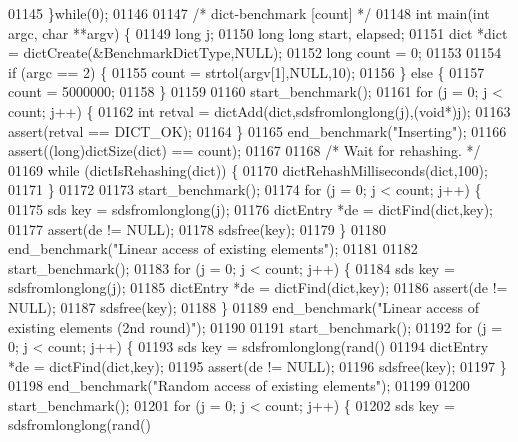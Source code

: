 \begin{DoxyCode}
{{{{{{{{{01145 \textcolor{preprocessor}{\}}\textcolor{preprocessor}{while}\textcolor{preprocessor}{(}0\textcolor{preprocessor}{)}\textcolor{preprocessor}{;}
01146 
01147 \textcolor{comment}{/* dict-benchmark [count] */}
01148 \textcolor{keywordtype}{int} main(\textcolor{keywordtype}{int} argc, \textcolor{keywordtype}{char} **argv) \{
01149     \textcolor{keywordtype}{long} j;
01150     \textcolor{keywordtype}{long} \textcolor{keywordtype}{long} start, elapsed;
01151     dict *dict = dictCreate(&BenchmarkDictType,NULL);
01152     \textcolor{keywordtype}{long} count = 0;
01153 
01154     \textcolor{keywordflow}{if} (argc == 2) \{
01155         count = strtol(argv[1],NULL,10);
01156     \} \textcolor{keywordflow}{else} \{
01157         count = 5000000;
01158     \}
01159 
01160     start\_benchmark();
01161     \textcolor{keywordflow}{for} (j = 0; j < count; j++) \{
01162         \textcolor{keywordtype}{int} retval = dictAdd(dict,sdsfromlonglong(j),(\textcolor{keywordtype}{void}*)j);
01163         assert(retval == DICT\_OK);
01164     \}
01165     end\_benchmark(\textcolor{stringliteral}{"Inserting"});
01166     assert((\textcolor{keywordtype}{long})dictSize(dict) == count);
01167 
01168     \textcolor{comment}{/* Wait for rehashing. */}
01169     \textcolor{keywordflow}{while} (dictIsRehashing(dict)) \{
01170         dictRehashMilliseconds(dict,100);
01171     \}
01172 
01173     start\_benchmark();
01174     \textcolor{keywordflow}{for} (j = 0; j < count; j++) \{
01175         sds key = sdsfromlonglong(j);
01176         dictEntry *de = dictFind(dict,key);
01177         assert(de != NULL);
01178         sdsfree(key);
01179     \}
01180     end\_benchmark(\textcolor{stringliteral}{"Linear access of existing elements"});
01181 
01182     start\_benchmark();
01183     \textcolor{keywordflow}{for} (j = 0; j < count; j++) \{
01184         sds key = sdsfromlonglong(j);
01185         dictEntry *de = dictFind(dict,key);
01186         assert(de != NULL);
01187         sdsfree(key);
01188     \}
01189     end\_benchmark(\textcolor{stringliteral}{"Linear access of existing elements (2nd round)"});
01190 
01191     start\_benchmark();
01192     \textcolor{keywordflow}{for} (j = 0; j < count; j++) \{
01193         sds key = sdsfromlonglong(rand() %
01194         dictEntry *de = dictFind(dict,key);
01195         assert(de != NULL);
01196         sdsfree(key);
01197     \}
01198     end\_benchmark(\textcolor{stringliteral}{"Random access of existing elements"});
01199 
01200     start\_benchmark();
01201     \textcolor{keywordflow}{for} (j = 0; j < count; j++) \{
01202         sds key = sdsfromlonglong(rand() %
}}}}}}}}}
\end{DoxyCode}

